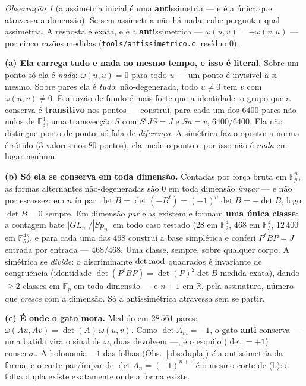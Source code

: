 \documentclass[11pt]{article}
\newcommand{\code}[1]{\texttt{\small #1}}
\newcommand{\R}{\mathbb R}
\newcommand{\F}{\mathbb F}
\theoremstyle{plain}
\theoremstyle{remark}
\newtheorem{obs}{Observação}
\begin{document}
\begin{obs}[a assimetria inicial é uma \textbf{anti}ssimetria --- e é a única que atravessa a dimensão]\label{obs:anti}
Se sem assimetria não há nada, cabe perguntar qual assimetria. A resposta é exata, e é a
\textbf{anti}ssimétrica --- $\omega(u,v)=-\omega(v,u)$ --- por cinco razões medidas
(\code{tools/antissimetrico.c}, resíduo $0$).

\textbf{(a) Ela carrega tudo e nada ao mesmo tempo, e isso é literal.} Sobre um ponto só ela é
\emph{nada}: $\omega(u,u)=0$ para todo $u$ --- um ponto é invisível a si mesmo. Sobre pares ela é
\emph{tudo}: não-degenerada, todo $u\neq0$ tem $v$ com $\omega(u,v)\neq0$. E a razão de fundo é mais
forte que a identidade: o grupo que a conserva é \textbf{transitivo} nos pontos --- construí, para cada
um dos $6400$ pares não-nulos de $\F_3^4$, uma transvecção $S$ com $S^tJS=J$ e $Su=v$, $6400/6400$. Ela
não distingue ponto de ponto; só fala de \emph{diferença}. A simétrica faz o oposto: a norma é rótulo
($3$ valores nos $80$ pontos), ela mede o ponto e por isso não é \emph{nada} em lugar nenhum.

\textbf{(b) Só ela se conserva em toda dimensão.} Contadas por força bruta em $\F_p^n$, as formas
alternantes não-degeneradas são $0$ em toda dimensão \emph{ímpar} --- e não por escassez: em $n$ ímpar
$\det B=\det(-B^t)=(-1)^n\det B=-\det B$, logo $\det B=0$ sempre. Em dimensão \emph{par} elas existem e
formam \textbf{uma única classe}: a contagem bate $|GL_n|/|Sp_n|$ em todo caso testado
($28$ em $\F_2^4$, $468$ em $\F_3^4$, $12\,400$ em $\F_5^4$), e para cada uma das $468$ construí a base
simplética e conferi $P^tBP=J$ entrada por entrada --- $468/468$. Uma classe, sempre, sobre qualquer
corpo. A simétrica se \emph{divide}: o discriminante $\det \bmod$ quadrados é invariante de congruência
(identidade $\det(P^tBP)=\det(P)^2\det B$ medida exata), dando $\geq 2$ classes em $\F_p$ em toda
dimensão --- e $n+1$ em $\R$, pela assinatura, número que \emph{cresce} com a dimensão. Só a
antissimétrica atravessa sem se partir.

\textbf{(c) É onde o gato mora.} Medido em $28\,561$ pares: $\omega(Au,Av)=\det(A)\,\omega(u,v)$. Como
$\det A_m=-1$, o gato \textbf{anti}-conserva --- uma batida vira o sinal de $\omega$, duas devolvem ---,
e o esquilo ($\det=+1$) conserva. A holonomia $-1$ das folhas (Obs.~\ref{obs:dupla}) \emph{é} a
antissimetria da forma, e o corte par/ímpar de $\det A_n=(-1)^{n+1}$ é o mesmo corte de (b): a folha
dupla existe exatamente onde a forma existe.


\end{obs}
\end{document}
